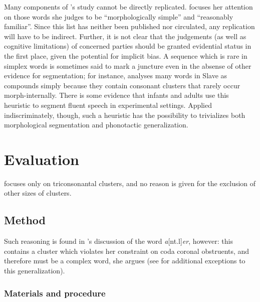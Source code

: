 Many components of \citeauthor{Pierrehumbert1994}'s study cannot be directly replicated. \citeauthor{Pierrehumbert1994} focuses her attention on those words she judges to be ``morphologically simple'' and ``reasonably familiar''. Since this list has neither been published nor circulated, any replication will have to be indirect. Further, it is not clear that the judgements (as well as cognitive limitations) of concerned parties should be granted evidential status in the first place, given the potential for implicit bias. A sequence which is rare in simplex words is sometimes said to mark a juncture even in the absense of other evidence for segmentation; for instance, \citet[546]{Rice2009d} analyses many words in Slave as compounds simply because they contain consonant clusters that rarely occur morph-internally. There is some evidence that infants \citep{Mattys2001b} and adults \citep{Brown1956,Hay2004a,McQueen1998b,Norris1997} use this heuristic to segment fluent speech in experimental settings. Applied indiscriminately, though, such a heuristic has the possibility to trivializes both morphological segmentation and phonotactic generalization. 

\section{Evaluation}
\label{4evaluation}

\citeauthor{Pierrehumbert1994} focuses only on triconsonantal clusters, and no reason is given for the exclusion of other sizes of clusters.

\subsection{Method}

Such reasoning is found in \citeauthor{Pierrehumbert1994}'s discussion of the word \emph{a}[nt.l]\emph{er}, however: this contains a cluster which violates her constraint on coda coronal obstruents, and therefore must be a complex word, she argues (see \citealt[164]{Borowsky1989} for additional exceptions to this generalization).

\subsubsection{Materials and procedure}

